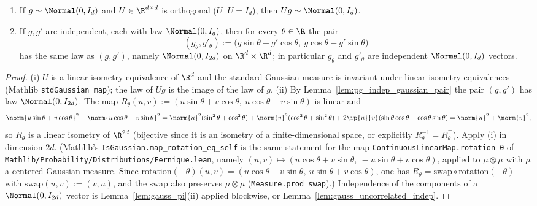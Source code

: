 \begin{lemma}\label{lem:gauss_rotation}
\begin{enumerate}
  \item[(i)] If $g \sim \Normal(0, I_d)$ and $U \in \R^{d\times d}$ is orthogonal
        ($U^\top U = I_d$), then $Ug \sim \Normal(0, I_d)$.
  \item[(ii)] If $g, g'$ are independent, each with law $\Normal(0, I_d)$, then for every
        $\theta \in \R$ the pair
        \[
          (g_\theta, g'_\theta) := \big(g\sin\theta + g'\cos\theta,\ g\cos\theta - g'\sin\theta\big)
        \]
        has the same law as $(g, g')$, namely $\Normal(0, I_{2d})$ on $\R^d \times \R^d$;
        in particular $g_\theta$ and $g'_\theta$ are independent $\Normal(0,I_d)$ vectors.
\end{enumerate}
\end{lemma}

\begin{proof}
(i) $U$ is a linear isometry equivalence of $\R^d$ and the standard Gaussian measure is
invariant under linear isometry equivalences (Mathlib \texttt{stdGaussian\_map}); the law of
$Ug$ is the image of the law of $g$. (ii) By Lemma~\ref{lem:pg_indep_gaussian_pair} the pair
$(g,g')$ has law $\Normal(0, I_{2d})$. The map
$R_\theta(u,v) := (u\sin\theta + v\cos\theta,\ u\cos\theta - v\sin\theta)$ is linear and
\[
  \norm{u\sin\theta + v\cos\theta}^2 + \norm{u\cos\theta - v\sin\theta}^2
  = \norm{u}^2(\sin^2\theta + \cos^2\theta) + \norm{v}^2(\cos^2\theta + \sin^2\theta)
    + 2\ip{u}{v}(\sin\theta\cos\theta - \cos\theta\sin\theta) = \norm{u}^2 + \norm{v}^2,
\]
so $R_\theta$ is a linear isometry of $\R^{2d}$ (bijective since it is an isometry of a
finite-dimensional space, or explicitly $R_\theta^{-1} = R_\theta^\top$). Apply (i) in
dimension $2d$. (Mathlib's \texttt{IsGaussian.map\_rotation\_eq\_self} is the same statement
for the map \texttt{ContinuousLinearMap.rotation θ} of
\texttt{Mathlib/Probability/Distributions/Fernique.lean}, namely
$(u,v)\mapsto(u\cos\theta + v\sin\theta,\ -u\sin\theta + v\cos\theta)$, applied to
$\mu\otimes\mu$ with $\mu$ a centered Gaussian measure. Since
$\mathrm{rotation}(-\theta)(u,v) = (u\cos\theta - v\sin\theta,\ u\sin\theta + v\cos\theta)$,
one has $R_\theta = \mathrm{swap}\circ\mathrm{rotation}(-\theta)$ with
$\mathrm{swap}(u,v) := (v,u)$, and the swap also preserves $\mu\otimes\mu$
(\texttt{Measure.prod\_swap}).) Independence of the components of
a $\Normal(0,I_{2d})$ vector is Lemma~\ref{lem:gauss_pi}(ii) applied blockwise, or
Lemma~\ref{lem:gauss_uncorrelated_indep}.
\end{proof}

